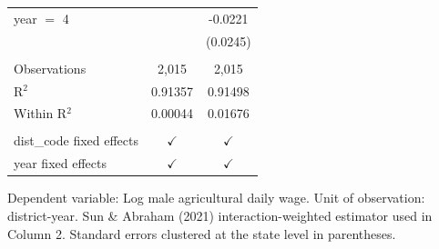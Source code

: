 \begin{table}[htbp]
\begin{tabular}{lcc}
      year $=$ 4                &               & -0.0221\\   
                                &               & (0.0245)\\   
       \\
      Observations              & 2,015         & 2,015\\  
      R$^2$                     & 0.91357       & 0.91498\\  
      Within R$^2$              & 0.00044       & 0.01676\\  
       \\
      dist\_code fixed effects  & $\checkmark$  & $\checkmark$\\   
      year fixed effects        & $\checkmark$  & $\checkmark$\\   
      \bottomrule
   \end{tabular}
   
   \par \raggedright 
   Dependent variable: Log male agricultural daily wage. Unit of observation: district-year. Sun \& Abraham (2021) interaction-weighted estimator used in Column 2. Standard errors clustered at the state level in parentheses.
\end{table}


